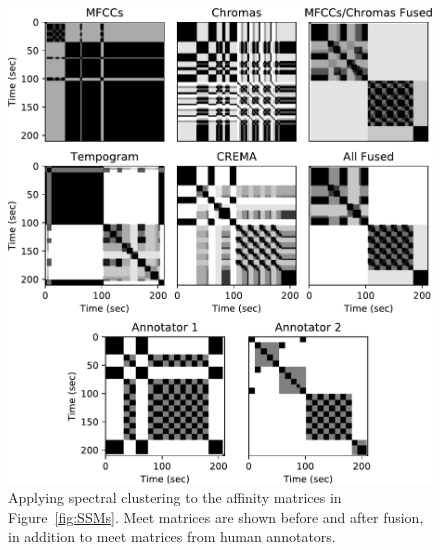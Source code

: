 \documentclass{article}
\begin{document}
\label{sec:spectral}
\begin{figure}
    \centering
    \includegraphics[width=0.95\columnwidth]{936_Meet.pdf}
    \caption{Applying spectral clustering to the affinity matrices in Figure~\ref{fig:SSMs}.  Meet matrices \cite{mcfee2017evaluating} are shown before and after fusion, in addition to meet matrices from human annotators.}\label{fig:MeetMatrices}
\end{figure}
\end{document}
